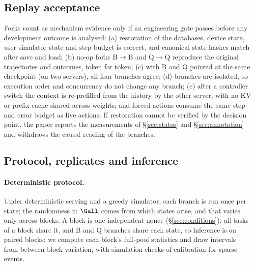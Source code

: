 \subsection{Replay acceptance}
\label{sec:replay}

Forks count as mechanism evidence only if an engineering gate passes before any development outcome is analysed:
(a) restoration of the databases, device state, user-simulator state and step budget is correct, and canonical state hashes match after save and load;
(b) no-op forks B$\to$B and Q$\to$Q reproduce the original trajectories and outcomes, token for token;
(c) with B and Q pointed at the same checkpoint (on two servers), all four branches agree;
(d) branches are isolated, so execution order and concurrency do not change any branch;
(e) after a controller switch the context is re-prefilled from the history by the other server, with no KV or prefix cache shared across weights; and forced actions consume the same step and error budget as live actions.
If restoration cannot be verified by the decision point, the paper reports the measurements of \S\ref{sec:states} and \S\ref{sec:annotation} and withdraws the causal reading of the branches. 

\subsection{Protocol, replicates and inference}
\label{sec:inference}

\paragraph{Deterministic protocol.} Under deterministic serving and a greedy simulator, each branch is run once per state; the randomness in $\Gall$ comes from which states arise, and that varies only across blocks. A block is one independent nonce (\S\ref{sec:conditions}); all tasks of a block share it, and B and Q branches share each state, so inference is on paired blocks: we compute each block's full-pool statistics and draw intervals from between-block variation, with simulation checks of calibration for sparse events. 

